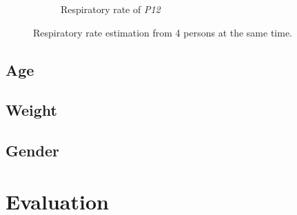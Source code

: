 \begin{figure}[t]
\begin{subfigure}{.45\textwidth}
  \caption{Respiratory rate of \emph{P12}}
  \label{fig:romy4_breath}
\end{subfigure}
\caption{Respiratory rate estimation from 4 persons at the same time.}
\label{fig:4pers_breath_meas}
\end{figure}

\subsection{Age}

\subsection{Weight}

\subsection{Gender}

\section{Evaluation}
